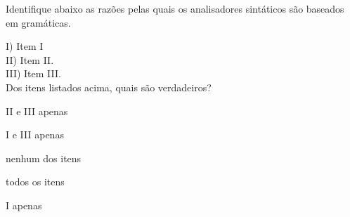 \question[10]

Identifique abaixo as razões pelas quais os analisadores sintáticos são
baseados em gramáticas.

I) Item I\\
II) Item II.\\
III) Item III.\\

Dos itens listados acima, quais são verdadeiros?\\

\begin{choices}
\item II e III apenas
\item I e III apenas
\item nenhum dos itens
\item todos os itens %
\item I apenas
\end{choices}
\answerline


